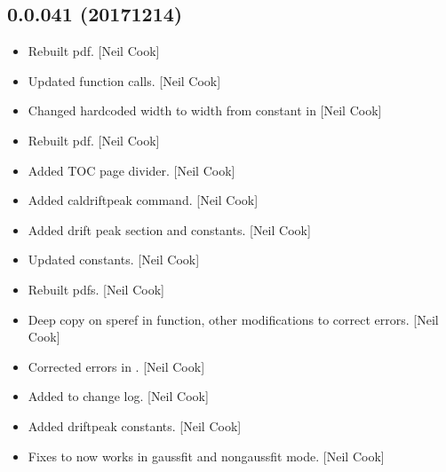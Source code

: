 \documentclass[a4paper,10pt,english]{report}
\begin{document}
\subsection{0.0.041 (2017\sphinxhyphen{}12\sphinxhyphen{}14)}
\label{\detokenize{misc/changelog:id529}}\begin{itemize}
\item {} 
Rebuilt pdf. {[}Neil Cook{]}

\item {} 
Updated  function calls. {[}Neil Cook{]}

\item {} 
Changed hardcoded width to width from constant in  {[}Neil
Cook{]}

\item {} 
Rebuilt pdf. {[}Neil Cook{]}

\item {} 
Added TOC page divider. {[}Neil Cook{]}

\item {} 
Added caldriftpeak command. {[}Neil Cook{]}

\item {} 
Added drift peak section and constants. {[}Neil Cook{]}

\item {} 
Updated constants. {[}Neil Cook{]}

\item {} 
Rebuilt pdfs. {[}Neil Cook{]}

\item {} 
Deep copy on speref in  function, other modifications
to correct errors. {[}Neil Cook{]}

\item {} 
Corrected errors in . {[}Neil Cook{]}

\item {} 
Added to change log. {[}Neil Cook{]}

\item {} 
Added drift\sphinxhyphen{}peak constants. {[}Neil Cook{]}

\item {} 
Fixes to  \sphinxhyphen{} now works in gaussfit and non\sphinxhyphen{}gaussfit mode.
{[}Neil Cook{]}

\end{itemize}
\end{document}
